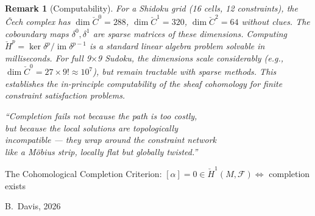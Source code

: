\documentclass[11pt,letterpaper]{article}
\newtheorem{remark}[conjecture]{Remark}
\newcommand{\Cech}{\check{C}}
\newcommand{\Hcech}{\check{H}}
\newcommand{\sheaf}{\mathcal{F}}
\DeclareMathOperator{\im}{im}
\begin{document}
\begin{remark}[Computability]
For a Shidoku grid (16 cells, 12 constraints), the \v{C}ech complex 
has $\dim \Cech^0 = 288$, $\dim \Cech^1 = 320$, $\dim \Cech^2 = 64$ 
without clues. The coboundary maps $\delta^0, \delta^1$ are sparse 
matrices of these dimensions. Computing $\Hcech^p = \ker \delta^p / 
\im \delta^{p-1}$ is a standard linear algebra problem solvable in 
milliseconds. For full 9$\times$9 Sudoku, the dimensions scale 
considerably (e.g., $\dim \Cech^0 = 27 \times 9! \approx 10^7$), 
but remain tractable with sparse methods. This establishes the 
\emph{in-principle computability} of the sheaf cohomology for finite 
constraint satisfaction problems.
\end{remark}

\vfill

\begin{center}
\large
\textit{``Completion fails not because the path is too costly, \\
but because the local solutions are topologically \\
incompatible --- they wrap around the constraint network \\
like a M\"{o}bius strip, locally flat but globally twisted.''}

\bigskip

The Cohomological Completion Criterion: 
$[\alpha] = 0 \in \Hcech^1(M, \sheaf) \iff$ completion exists

\bigskip

B.\ Davis, 2026
\end{center}
\end{document}

